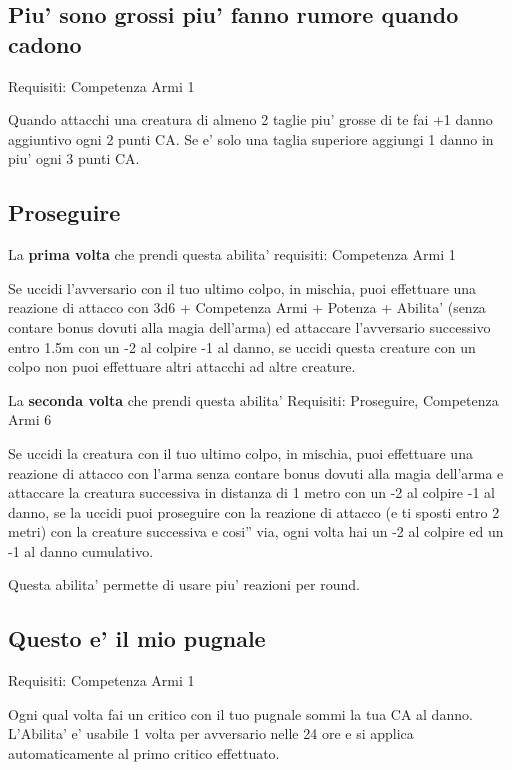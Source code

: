 \documentclass[a4paper,11pt,twoside,openany]{book}
\begin{document}
	\subsection{Piu' sono grossi piu' fanno rumore quando cadono}
	
	Requisiti: Competenza Armi 1
	
	Quando attacchi una creatura di almeno 2 taglie piu' grosse di te fai +1 danno aggiuntivo ogni 2 punti CA. Se e' solo una taglia superiore aggiungi 1 danno in piu' ogni 3 punti CA.
	
	\subsection{Proseguire}
	
	La \textbf{prima volta} che prendi questa abilita' requisiti: Competenza Armi 1
	
	Se uccidi l'avversario con il tuo ultimo colpo, in mischia, puoi effettuare una reazione di attacco con 3d6 + Competenza Armi + Potenza + Abilita' (senza contare bonus dovuti alla magia dell'arma) ed attaccare l'avversario successivo entro 1.5m con un -2 al colpire -1 al danno, se uccidi questa creature con un colpo non puoi effettuare altri attacchi ad altre creature.
	
	La \textbf{seconda volta} che prendi questa abilita' Requisiti: Proseguire, Competenza Armi 6
	
	Se uccidi la creatura con il tuo ultimo colpo, in mischia, puoi effettuare una reazione di attacco con l'arma senza contare bonus dovuti alla magia dell'arma e attaccare la creatura successiva in distanza di 1 metro con un -2 al colpire -1 al danno, se la uccidi puoi proseguire con la reazione di attacco (e ti sposti entro 2 metri) con la creature successiva e cosi'' via, ogni volta hai un -2 al colpire ed un -1 al danno cumulativo.
	
	Questa abilita' permette di usare piu' reazioni per round.
	
	\subsection{Questo e' il mio pugnale}
	
	Requisiti: Competenza Armi 1
	
	Ogni qual volta fai un critico con il tuo pugnale sommi la tua CA al danno. L'Abilita' e' usabile 1 volta per avversario nelle 24 ore e si applica automaticamente al primo critico effettuato.
	
\end{document}
